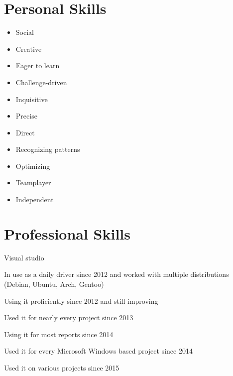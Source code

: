 \documentclass[]{friggeri-cv} %
\begin{document}

\section{Personal Skills}

\begin{multicols}{2}
   \begin{itemize}
      \item Social
      \item Creative
      \item Eager to learn
      \item Challenge-driven
      \item Inquisitive
      \item Precise
      \item Direct
      \item Recognizing patterns
      \item Optimizing
      \item Teamplayer
      \item Independent
   \end{itemize}
\end{multicols}


\section{Professional Skills}

\begin{labeling}{Visual studio}
\item [Linux] In use as a daily driver since 2012 and worked with multiple distributions (Debian, Ubuntu, Arch, Gentoo)
\item [Vim] Using it proficiently since 2012 and still improving
\item [Git] Used it for nearly every project since 2013
\item [\LaTeX] Using it for most reports since 2014
\item [Visual studio] Used it for every Microsoft Windows based project since 2014
\item [CVS] Used it on various projects since 2015
\end{labeling}

\end{document}

